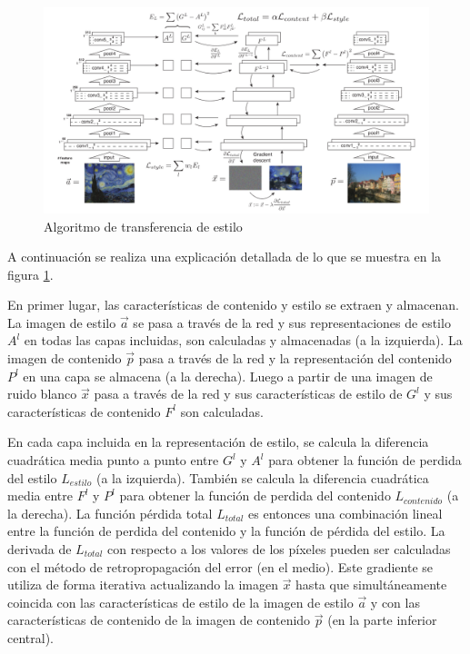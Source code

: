 \documentclass[a4paper,11pt,spanish]{book}
\begin{document}
      \begin{figure}[h]
	\includegraphics[width=\textwidth]{./img/gatys_method.png}
	\caption{Algoritmo de transferencia de estilo}
	\label{fig:gatys_generacion}
      \end{figure}
      A continuación se realiza una explicación detallada de lo que se muestra en la figura \ref{fig:gatys_generacion}.
     
      En primer lugar, las características de contenido y estilo se extraen y almacenan. La imagen de estilo $\overrightarrow{a}$ se pasa a través de la red
      y sus representaciones de estilo $A^l$ en todas las capas incluidas, son calculadas y almacenadas (a la izquierda). La imagen de contenido $\overrightarrow{p}$ pasa a través
      de la red y la representación del contenido $P^l$ en una capa se almacena (a la derecha). Luego a partir de una imagen de ruido blanco $\overrightarrow{x}$ pasa a través de la red y sus
      características de estilo de $G^l$ y sus características de contenido $F^l$ son calculadas.
      
      En cada capa incluida en la representación de estilo, se calcula la diferencia cuadrática media punto a punto entre $G^l$ y $A^l$ para obtener la función de perdida del estilo
      $L_{estilo}$ (a la izquierda). También se calcula la diferencia cuadrática media entre $F^l$ y $P^l$ para obtener la función de perdida del contenido $L_{contenido}$ (a la derecha).
      La función pérdida total $L_{total}$ es entonces una combinación lineal entre la función de perdida del contenido y la función de pérdida del estilo.
      La derivada de  $L_{total}$ con respecto a los valores de los píxeles pueden ser calculadas con el método  de retropropagación del error (en el medio).
      Este gradiente se utiliza de forma iterativa actualizando la imagen $\overrightarrow{x}$ hasta que simultáneamente coincida con las características de estilo de la imagen
      de estilo $\overrightarrow{a}$ y con las características de contenido de la imagen de contenido $\overrightarrow{p}$ (en la parte inferior central).
      
\end{document}
